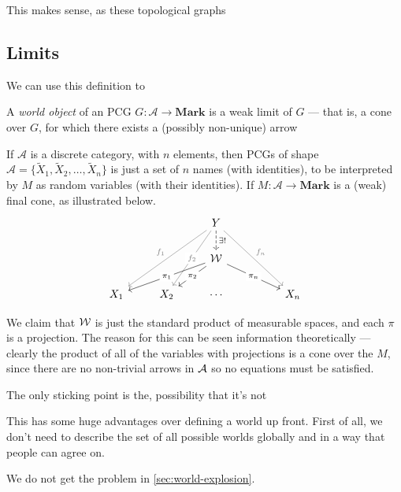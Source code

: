 \documentclass{article}
\begin{document}
	This makes sense, as these topological graphs
	\subsection{Limits } \label{sec:cat-worlds}
	
	We can use this definition to 
	
	\begin{defn}
		A \emph{world object} of an PCG $G : \mathcal A \to \mathbf{Mark}$ is a weak limit of $G$ --- that is, a cone over $G$, for which there exists a (possibly non-unique) arrow 
	\end{defn}

	\begin{example}
		If $\mathcal A$ is a discrete category, with $n$ elements, then PCGs of shape $\mathcal A = \{\tilde X_1, \tilde X_2, \ldots, \tilde X_n\}$ is just a set of $n$ names (with identities), to be interpreted by $M$ as random variables (with their identities). If $M : \mathcal A \to \mathbf{Mark}$ is a (weak) final cone, as illustrated below.
		\[ \begin{tikzcd}
				&& Y  \ar[ddll, gray, "f_1"']\ar[ddl,gray, "f_2"description]\ar[ddrr,gray, "f_n"] \ar[d, dashed, "\exists!"]\\
				&& \mathcal W \ar[dll, "\pi_1"description]\ar[dl, "\pi_2"description]\ar[drr, "\pi_n"description] \\
				X_1 & X_2 & \cdots & & X_n
			\end{tikzcd} \]
			
		We claim that $\cal W$ is just the standard product of measurable spaces, and each $\pi$ is a projection. The reason for this can be seen information theoretically --- clearly the product of all of the variables with projections is a cone over the $M$, since there are no non-trivial arrows in $\cal A$ so no equations must be satisfied. %
		
		The only sticking point is the, possibility that it's not  %
	\end{example}

	This has some huge advantages over defining a world up front. First of all, we don't need to describe the set of all possible worlds globally and in a way that people can agree on. 
	
	We do not get the problem in \ref{sec:world-explosion}.
	
	
\end{document}
